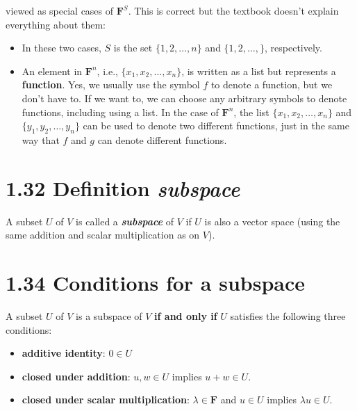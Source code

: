 \documentclass[12pt, letterpaper, oneside]{book}
\begin{document}
\begin{enumerate}
    viewed as special cases of $\mathbf{F}^S$. This is correct but the textbook
    doesn't explain everything about them:
    \begin{itemize}
      \item In these two cases, $S$ is the set $\{ 1, 2, \ldots, n \}$ and
      $\{ 1, 2, \ldots, \}$, respectively.
      \item An element in $\mathbf{F}^n$, i.e., $\{ x_1, x_2, \ldots, x_n \}$,
        is written as a list but represents a \textbf{function}. Yes, we
        usually use the symbol $f$ to denote a function, but we don't have to.
        If we want to, we can choose any arbitrary symbols to denote functions,
        including using a list. In the case of $\mathbf{F}^n$, the list
        $\{ x_1, x_2, \ldots, x_n \}$ and $\{ y_1, y_2, \ldots, y_n \}$ can be
        used to denote two different functions, just in the same way that $f$
        and $g$ can denote different functions.
    \end{itemize}
\end{enumerate}

\section{1.32 Definition \textit{subspace}}

A subset $U$ of $V$ is called a \textbf{\textit{subspace}} of $V$ if $U$ is
also a vector space (using the same addition and scalar multiplication as on
$V$).

\section{1.34 Conditions for a subspace}

A subset $U$ of $V$ is a subspace of $V$ \textbf{if and only if} $U$ satisfies
the following three conditions:

\begin{itemize}
  \item \textbf{additive identity}: $0 \in U$
  \item \textbf{closed under addition}: $u, w \in U$ implies $u + w \in U$.
  \item \textbf{closed under scalar multiplication}: $\lambda \in \mathbf{F}$
    and $u \in U$ implies $\lambda u \in U$.
\end{itemize}
\end{document}
